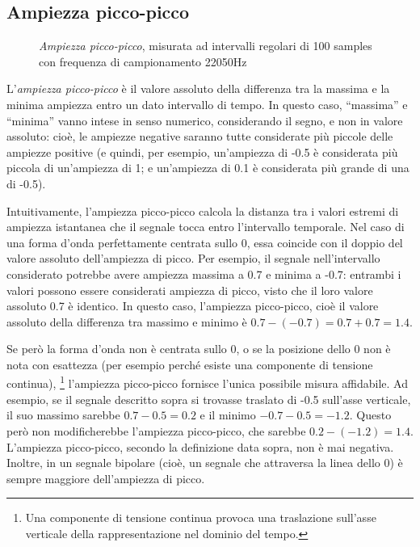 \subsection{Ampiezza picco-picco}

\begin{figure}
    \begin{center}
       \scalebox{0.6} {}
    \end{center}
    \caption{\emph{Ampiezza picco-picco}, misurata ad intervalli regolari di 100 samples con frequenza di campionamento 22050Hz}
\end{figure}

L'\emph{ampiezza picco-picco} è il valore assoluto della differenza tra la massima e la minima ampiezza entro un dato intervallo di tempo. In questo caso, ``massima'' e ``minima'' vanno intese in senso numerico, considerando il segno, e non in valore assoluto: cioè, le ampiezze negative saranno tutte considerate più piccole delle ampiezze positive (e quindi, per esempio, un'ampiezza di -0.5 è considerata più piccola di un'ampiezza di 1; e un'ampiezza di 0.1 è considerata più grande di una di -0.5). 

Intuitivamente, l'ampiezza picco-picco calcola la distanza tra i valori estremi di ampiezza istantanea che il segnale tocca entro l'intervallo temporale. Nel caso di una forma d'onda perfettamente centrata sullo 0, essa coincide con il doppio del valore assoluto dell'ampiezza di picco. Per esempio, il segnale nell'intervallo considerato potrebbe avere ampiezza massima a 0.7 e minima a -0.7: entrambi i valori possono essere considerati ampiezza di picco, visto che il loro valore assoluto 0.7 è identico. In questo caso, l'ampiezza picco-picco, cioè il valore assoluto della differenza tra massimo e minimo è $0.7 - (-0.7) = 0.7 + 0.7 = 1.4$. 

Se però la forma d'onda non è centrata sullo 0, o se la posizione dello 0 non è nota con esattezza (per esempio perché esiste una componente di tensione continua),%
\footnote{Una componente di tensione continua provoca una traslazione sull'asse verticale della rappresentazione nel dominio del tempo.}
l'ampiezza picco-picco fornisce l'unica possibile misura affidabile. Ad esempio, se il segnale descritto sopra si trovasse traslato di -0.5 sull'asse verticale, il suo massimo sarebbe $0.7 - 0.5 = 0.2$ e il minimo $-0.7 - 0.5 = -1.2$. Questo però non modificherebbe l'ampiezza picco-picco, che sarebbe $0.2 - (-1.2) = 1.4$. L'ampiezza picco-picco, secondo la definizione data sopra, non è mai negativa. Inoltre, in un segnale bipolare (cioè, un segnale che attraversa la linea dello 0) è sempre maggiore dell'ampiezza di picco.




